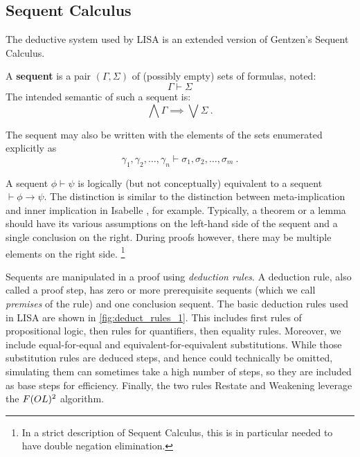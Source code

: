 \subsection{Sequent Calculus}
\label{subsec:lk}
The deductive system used by LISA is an extended version of Gentzen's Sequent Calculus.
\begin{defin}
  A \textbf{sequent} is a pair $(\Gamma, \Sigma)$ of (possibly empty) sets of formulas, noted:
  $$\Gamma \vdash \Sigma$$
  The intended semantic of such a sequent is:
  \begin{equation*}
    \label{eq:SequentSemantic}
    \bigwedge \Gamma \implies \bigvee \Sigma~.
  \end{equation*}

  The sequent may also be written with the elements of the sets enumerated explicitly as
  \begin{equation*}
    \gamma_1, \gamma_2, \ldots, \gamma_n \vdash \sigma_1, \sigma_2, \ldots, \sigma_m~.
  \end{equation*}
\end{defin}
A sequent $\phi \vdash \psi$ is logically (but not conceptually) equivalent to a sequent $\vdash \phi \rightarrow \psi$. The distinction is similar to the distinction between meta-implication and inner implication in Isabelle \cite{paulsonIsabelleNext7001993}, for example. Typically, a theorem or a lemma should have its various assumptions on the left-hand side of the sequent and a single conclusion on the right. During proofs however, there may be multiple elements on the right side. \footnote{In a strict description of Sequent Calculus, this is in particular needed to have double negation elimination.}

Sequents are manipulated in a proof using \emph{deduction rules}. A deduction rule, also called a proof step, has zero or more prerequisite sequents (which we call \emph{premises} of the rule) and one conclusion sequent. The basic deduction rules used in LISA are shown in \autoref{fig:deduct_rules_1}.
This includes first rules of propositional logic, then rules for quantifiers, then equality rules. Moreover, we include equal-for-equal and equivalent-for-equivalent substitutions. While those substitution rules are deduced steps, and hence could technically be omitted, simulating them can sometimes take a high number of steps, so they are included as base steps for efficiency.
Finally, the two rules Restate and Weakening leverage the $F(OL)\textsuperscript{2}$ algorithm.



